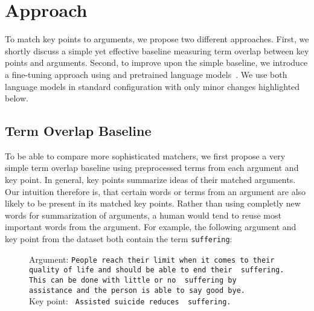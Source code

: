 \section{Approach}\label{approach}

To match key points to arguments, we propose two different approaches.
First, we shortly discuss a simple yet effective baseline measuring term overlap between key points and arguments.
Second, to improve upon the simple baseline, we introduce a fine-tuning approach using \Bert and \Roberta pretrained language models~\cite{DevlinCLT2019,LiuOGDJCLLZS2019}. We use both language models in standard configuration with only minor changes highlighted below.

\subsection{Term Overlap Baseline}
To be able to compare more sophisticated matchers, we first propose a very simple term overlap baseline using preprocessed terms from each argument and key point. 
In general, key points summarize ideas of their matched arguments.
Our intuition therefore is, that certain words or terms from an argument are also likely to be present in its matched key points.
Rather than using completly new words for summarization of arguments, a human would tend to reuse most important words from the argument.
For example, the following argument and key point from the \ArgKP dataset both contain the term \texttt{suffering}: \\

\begin{figure}[H]
    Argument: \texttt{People reach their limit when it comes to their quality of life and should be able to end their {\color{blue} suffering}. This can be done with little or no {\color{blue} suffering} by {\color{orange} assistance} and the person is able to say good bye.} \\
    Key point: \texttt{{\color{orange} Assisted} suicide reduces {\color{blue} suffering}.}    
\end{figure}

